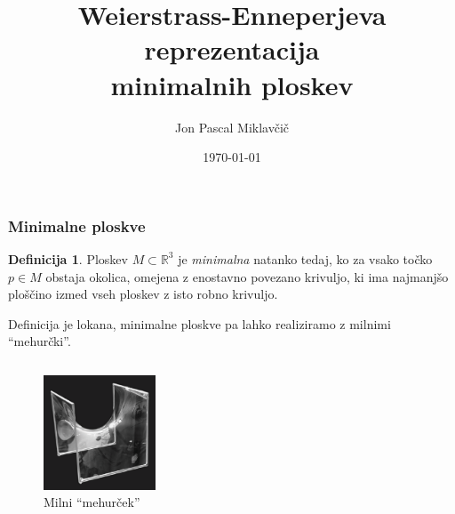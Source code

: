 \documentclass[10pt]{beamer}
\title[Weierstrass-Enneperjeva parametrizacija]{Weierstrass-Enneperjeva reprezentacija\\minimalnih ploskev}
\subtitle{}
\author[Jon Pascal Miklavčič]{Jon Pascal Miklavčič}
\institute[]{Mentor: doc.~dr.~Uroš Kuzman}
\date{\tiny \today}
\theoremstyle{definition}
\newtheorem{definicija}{Definicija}
\theoremstyle{remark}
\theoremstyle{plain}
\numberwithin{equation}{section}  %
\begin{document}
\frame{\titlepage}

\begin{frame}
    \frametitle{Minimalne ploskve}

    \begin{definicija}
        Ploskev $M \subset \mathbb{R}^3$ je \emph{minimalna} natanko tedaj, ko za vsako točko $p \in M$ obstaja okolica, omejena z enostavno povezano krivuljo, ki ima najmanjšo ploščino izmed vseh ploskev z isto robno krivuljo. 
    \end{definicija}

    Definicija je lokana, minimalne ploskve pa lahko realiziramo z milnimi “mehurčki”.

    \begin{columns}[t]
        \begin{column}{0.45\textwidth}
            \centering
            \begin{figure}
                \includegraphics[width=9em]{../Slike/Soap_Film.png}
                \caption{Milni “mehurček”}
                \label{fig:1}
            \end{figure}
        \end{column}

        \begin{column}{0.45\textwidth}
            \centering
            \begin{figure}[H]
                \centering
\end{figure}
\end{column}
\end{columns}
\end{frame}
\end{document}
